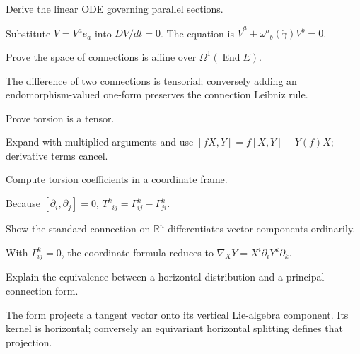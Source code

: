 \begin{problem}\label{prob:vii21-05}
Derive the linear ODE governing parallel sections.
\end{problem}
\begin{solution}
Substitute \(V=V^ae_a\) into \(DV/dt=0\). The equation is \(\dot V^a+\omega^a{}_b(\dot\gamma)V^b=0\).
\end{solution}

\begin{problem}\label{prob:vii21-06}
Prove the space of connections is affine over \(\Omega^1(\operatorname{End}E)\).
\end{problem}
\begin{solution}
The difference of two connections is tensorial; conversely adding an endomorphism-valued one-form preserves the connection Leibniz rule.
\end{solution}

\begin{problem}\label{prob:vii21-07}
Prove torsion is a tensor.
\end{problem}
\begin{solution}
Expand with multiplied arguments and use \([fX,Y]=f[X,Y]-Y(f)X\); derivative terms cancel.
\end{solution}

\begin{problem}\label{prob:vii21-08}
Compute torsion coefficients in a coordinate frame.
\end{problem}
\begin{solution}
Because \([\partial_i,\partial_j]=0\), \(T^k{}_{ij}=\Gamma^k_{ij}-\Gamma^k_{ji}\).
\end{solution}

\begin{problem}\label{prob:vii21-09}
Show the standard connection on \(\mathbb R^n\) differentiates vector components ordinarily.
\end{problem}
\begin{solution}
With \(\Gamma^k_{ij}=0\), the coordinate formula reduces to \(\nabla_XY=X^i\partial_iY^k\partial_k\).
\end{solution}

\begin{problem}\label{prob:vii21-10}
Explain the equivalence between a horizontal distribution and a principal connection form.
\end{problem}
\begin{solution}
The form projects a tangent vector onto its vertical Lie-algebra component. Its kernel is horizontal; conversely an equivariant horizontal splitting defines that projection.
\end{solution}

